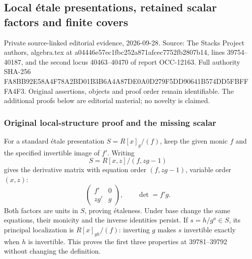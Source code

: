 \subsection{Local étale presentations, retained scalar factors and finite covers}\label{algebra-proof-052-local-uxe9tale-presentations-retained-scalar-factors-and-finite-covers}

Private source-linked editorial evidence, 2026-09-28. Source: The Stacks Project authors, algebra.tex at a044\allowbreak{}46e5\allowbreak{}7ec1\allowbreak{}fbc2\allowbreak{}52a8\allowbreak{}71af\allowbreak{}cec7\allowbreak{}752f\allowbreak{}b280\allowbreak{}7b14, lines 39754--40187, and the second locus 40463--40470 of report OCC-12163. Full authority SHA-256 FA8B\allowbreak{}B92E\allowbreak{}58A4\allowbreak{}F78A\allowbreak{}2BD0\allowbreak{}1B3B\allowbreak{}6A4A\allowbreak{}87DE\allowbreak{}0A0D\allowbreak{}279F\allowbreak{}5DD9\allowbreak{}0641\allowbreak{}B574\allowbreak{}DD5F\allowbreak{}BFFF\allowbreak{}A4F3. Original assertions, objects and proof order remain identifiable. The additional proofs below are editorial material; no novelty is claimed.

\subsubsection{Original local-structure proof and the missing scalar}\label{algebra-proof-052-original-local-structure-proof-and-the-missing-scalar}

For a standard étale presentation \(S=R[x]_g/(f)\), keep the given monic \(f\) and the specified invertible image of \(f'\). Writing \[
S=R[x,z]/(f,zg-1)
\] gives the derivative matrix with equation order \((f,zg-1)\), variable order \((x,z)\): \[
\begin{pmatrix} f'&0\\zg'&g\end{pmatrix},
\qquad \det=f'g.
\] Both factors are units in \(S\), proving étaleness. Under base change the same equations, their monicity and the inverse identities persist. If \(s=h/g^a\in S\), its principal localization is \(R[x]_{gh}/(f)\): inverting \(g\) makes \(s\) invertible exactly when \(h\) is invertible. This proves the first three properties at 39781--39792 without changing the definition.

